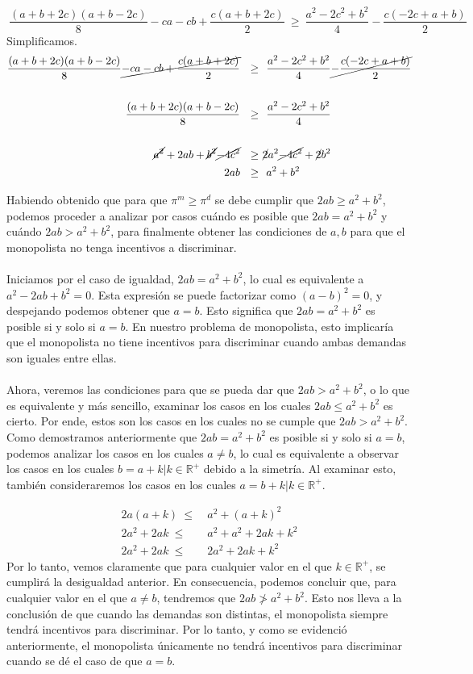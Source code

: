 \documentclass[11pt,a4paper]{article}
\newcommand{\R}{\mathbb{R}}
\begin{document}
\begin{flushleft}
    $$~\frac{(a+b+2c)(a+b-2c)}{8}-ca-cb+\frac{c(a+b+2c)}{2}~\geq~\frac{a^2-2c^2+b^2}{4}-\frac{c(-2c+a+b)}{2}~$$
    Simplificamos.
    \begin{align*}
        \frac{(a+b+2c)(a+b-2c)}{8}\cancel{-ca-cb+\frac{c(a+b+2c)}{2}}~~\geq&~~\frac{a^2-2c^2+b^2}{4}\cancel{-\frac{c(-2c+a+b)}{2}}\\~\\
        \frac{(a+b+2c)(a+b-2c)}{8}~~\geq&~~\frac{a^2-2c^2+b^2}{4}\\~\\
        \cancel{a^{2}}+2ab+\cancel{b^{2}}\cancel{-4c^{2}}~~\geq&~\cancel{2}a^2\cancel{-4c^{2}}+\cancel{2}b^2\\
        2ab~~\geq&~~a^2+b^2
    \end{align*}

    Habiendo obtenido que para que $\pi^m \geq \pi^d$ se debe cumplir que $2ab \geq a^2 + b^2$, podemos proceder a analizar por casos cuándo es posible que $2ab = a^2 + b^2$ y cuándo $2ab > a^2 + b^2$, para finalmente obtener las condiciones de $a, b$ para que el monopolista no tenga incentivos a discriminar.\\~\\
    
    Iniciamos por el caso de igualdad, $2ab = a^2 + b^2$, lo cual es equivalente a $a^2 - 2ab + b^2 = 0$. Esta expresión se puede factorizar como $(a - b)^2 = 0$, y despejando podemos obtener que $a = b$. Esto significa que $2ab = a^2 + b^2$ es posible si y solo si $a = b$. En nuestro problema de monopolista, esto implicaría que el monopolista no tiene incentivos para discriminar cuando ambas demandas son iguales entre ellas.\\~\\

    Ahora, veremos las condiciones para que se pueda dar que $2ab > a^2 + b^2$, o lo que es equivalente y más sencillo, examinar los casos en los cuales $2ab \leq a^2 + b^2$ es cierto. Por ende, estos son los casos en los cuales no se cumple que $2ab > a^2 + b^2$. Como demostramos anteriormente que $2ab = a^2 + b^2$ es posible si y solo si $a = b$, podemos analizar los casos en los cuales $a \neq b$, lo cual es equivalente a observar los casos en los cuales $b = a + k|k \in \R^{+}$ debido a la simetría. Al examinar esto, también consideraremos los casos en los cuales $a = b + k|k \in \R^{+}$.

    \begin{align*}
        2a(a+k) ~\leq&~ a^2+(a+k)^2\\
        2a^2+2ak~\leq&~ a^2+a^2+2ak+k^2\\
        2a^2+2ak~\leq&~ 2a^2+2ak+k^2
    \end{align*}
    Por lo tanto, vemos claramente que para cualquier valor en el que $k \in \R^{+}$, se cumplirá la desigualdad anterior. En consecuencia, podemos concluir que, para cualquier valor en el que $a \neq b$, tendremos que $2ab \ngtr a^2 + b^2$. Esto nos lleva a la conclusión de que cuando las demandas son distintas, el monopolista siempre tendrá incentivos para discriminar. Por lo tanto, y como se evidenció anteriormente, el monopolista únicamente no tendrá incentivos para discriminar cuando se dé el caso de que $a = b$.


\end{flushleft}
\end{document}
